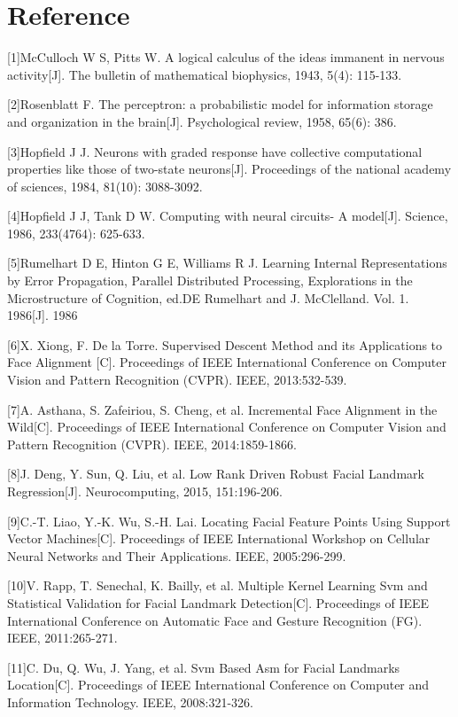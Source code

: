 \documentclass{article}
\begin{document}
\small{
\section*{Reference}
[1]McCulloch W S, Pitts W. A logical calculus of the ideas immanent in nervous activity[J]. The
bulletin of mathematical biophysics, 1943, 5(4): 115-133.

[2]Rosenblatt F. The perceptron: a probabilistic model for information storage and
organization in the brain[J]. Psychological review, 1958, 65(6): 386.

[3]Hopfield J J. Neurons with graded response have collective computational properties like those of two-state neurons[J]. Proceedings of the national academy of sciences, 1984, 81(10): 3088-3092.

[4]Hopfield J J, Tank D W. Computing with neural circuits- A model[J]. Science, 1986,
233(4764): 625-633.

[5]Rumelhart D E, Hinton G E, Williams R J. Learning Internal Representations by Error
Propagation, Parallel Distributed Processing, Explorations in the Microstructure of Cognition,
ed.DE Rumelhart and J. McClelland. Vol. 1. 1986[J]. 1986

[6]X. Xiong, F. De la Torre. Supervised Descent Method and its Applications to Face Alignment [C]. Proceedings of IEEE International Conference on Computer Vision and Pattern Recognition (CVPR). IEEE, 2013:532-539.

[7]A. Asthana, S. Zafeiriou, S. Cheng, et al. Incremental Face Alignment in the Wild[C]. Proceedings of IEEE International Conference on Computer Vision and Pattern Recognition (CVPR). IEEE, 2014:1859-1866.

[8]J. Deng, Y. Sun, Q. Liu, et al. Low Rank Driven Robust Facial Landmark Regression[J]. Neurocomputing, 2015, 151:196-206.

[9]C.-T. Liao, Y.-K. Wu, S.-H. Lai. Locating Facial Feature Points Using Support Vector Machines[C]. Proceedings of IEEE International Workshop on Cellular Neural Networks and Their Applications. IEEE, 2005:296-299.

[10]V. Rapp, T. Senechal, K. Bailly, et al. Multiple Kernel Learning Svm and Statistical Validation for Facial Landmark Detection[C]. Proceedings of IEEE International Conference on Automatic Face and Gesture Recognition (FG). IEEE, 2011:265-271.

[11]C. Du, Q. Wu, J. Yang, et al. Svm Based Asm for Facial Landmarks Location[C]. Proceedings of IEEE International Conference on Computer and Information Technology. IEEE, 2008:321-326.

}
\end{document}
